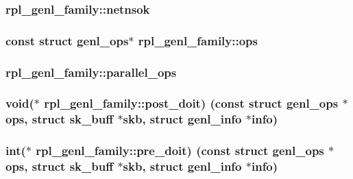 \subsubsection[{netnsok}]{ rpl\+\_\+genl\+\_\+family\+::netnsok}\label{structrpl__genl__family_a126424f7f454c57970d3aa43fa6f6321}
\hypertarget{structrpl__genl__family_a2d6fa633ee14f455af7965bf76508255}{}
\subsubsection[{ops}]{\setlength{\rightskip}{0pt plus 5cm}const struct genl\+\_\+ops$\ast$ rpl\+\_\+genl\+\_\+family\+::ops}\label{structrpl__genl__family_a2d6fa633ee14f455af7965bf76508255}
\hypertarget{structrpl__genl__family_a0c6f86f5d811b297add5721fc9412545}{}
\subsubsection[{parallel\+\_\+ops}]{ rpl\+\_\+genl\+\_\+family\+::parallel\+\_\+ops}\label{structrpl__genl__family_a0c6f86f5d811b297add5721fc9412545}
\hypertarget{structrpl__genl__family_a2b7972eca0ca87a04c701b03fe78e23a}{}
\subsubsection[{post\+\_\+doit}]{\setlength{\rightskip}{0pt plus 5cm}void($\ast$ rpl\+\_\+genl\+\_\+family\+::post\+\_\+doit) (const struct genl\+\_\+ops $\ast${\bf ops}, struct sk\+\_\+buff $\ast$skb, struct genl\+\_\+info $\ast$info)}\label{structrpl__genl__family_a2b7972eca0ca87a04c701b03fe78e23a}
\hypertarget{structrpl__genl__family_aa5134cfc246e4d34814262c04c2e7a87}{}
\subsubsection[{pre\+\_\+doit}]{\setlength{\rightskip}{0pt plus 5cm}int($\ast$ rpl\+\_\+genl\+\_\+family\+::pre\+\_\+doit) (const struct genl\+\_\+ops $\ast${\bf ops}, struct sk\+\_\+buff $\ast$skb, struct genl\+\_\+info $\ast$info)}\label{structrpl__genl__family_aa5134cfc246e4d34814262c04c2e7a87}
\hypertarget{structrpl__genl__family_a09a64c948abbbd61907dfd9f0d17663d}{}
